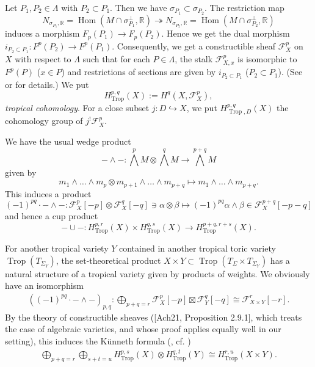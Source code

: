 \documentclass[12pt,a4]{amsart}
\def\R{\mathbb{R}}
\def\F{\mathscr{F}}
\def\Trop{\mathop{\mathrm{trop}}\nolimits}
\def\Hom{\mathop{\mathrm{Hom}}\nolimits}
\def\Trop{\mathop{\mathrm{Trop}}\nolimits}
\numberwithin{equation}{section}
\numberwithin{figure}{section}
\begin{document}
  Let $P_1,P_2 \in \Lambda$ with $P_2 \subset P_1$.
  Then we have $\sigma_{P_1} \subset \sigma_{P_2}$.
  The restriction map 
   $$ N_{\sigma_{P_1},\R } 
    = \Hom ( M \cap \sigma_{P_1}^{\perp } , \R ) 
   \twoheadrightarrow N_{\sigma_{P_2},\R }
    = \Hom ( M \cap \sigma_{P_2}^{\perp } , \R ) 
    $$ induces
  a morphism 
  $  F_p(P_1)  
      \to F_p(P_2).$
  Hence we get the dual morphism 
  $ i_{P_2 \subset P_1 } \colon  F^p(P_2)  
      \to F^p(P_1).$
  Consequently, we get a constructible sheaf $\F^p_X$ on $X$
   with respect to $\Lambda$
     such that for  each $P \in \Lambda $, 
        the stalk $\F^p_{X,x}$ is isomorphic to $F^p ( P )$ 
         ($x \in P$) 
         and restrictions of sections are given by 
      $ i_{P_2 \subset P_1 } $ ($P_2 \subset P_1$). 
     (See 
     \cite[Section 2.4]{MikhalkinZharkovTropicaleignewaveandintermediatejacobians2014} or 
     \cite[Section 3.1]{JellShawSmackaSuperformstropicalcohomologyandPoincarduality2019} for details.)   
  We put 
  $$H_{\Trop}^{p,q}(X ) := H^{ q}(X,  \F^p_X), $$
  \emph{tropical cohomology}. 
  For a close subset $j \colon D \hookrightarrow X$, 
  we put 
   $H_{\Trop,D}^{p,q}(X)$ the cohomology group 
   of $j^!\F_X^p$.


  We have the usual wedge product 
    $$ -\wedge - \colon \bigwedge^p M  \otimes \bigwedge^q M   
        \to \bigwedge^{p+q} M  $$
        given by 
    $$ m_1 \wedge \dots \wedge m_p \otimes
       m_{p+1}  \wedge \dots \wedge m_{p+q} 
       \mapsto 
     m_1 \wedge \dots \wedge m_{p+q} .$$ 
  This induces a product 
    $$  (-1)^{pq} \cdot  - \wedge - \colon \F^p_X [-p] \otimes \F^q_X [-q] 
     \ni \alpha \otimes \beta 
     \mapsto 
     (-1)^{pq} \alpha \wedge \beta 
     \in \F^{p+q}_X [-p-q]$$
  and hence a cup product 
    $$ - \cup - \colon H^{p,r}_{\Trop} (X) \times H^{q,s}_{\Trop} (X) 
       \to H^{p+q,r+s}_{\Trop} (X).$$


  For another tropical variety $Y$ contained in another tropical toric variety $\Trop (T_{\Sigma_Y})$, 
   the set-theoretical product $X \times Y \subset \Trop (T_{\Sigma} \times T_{\Sigma_Y})$
   has a natural structure of a tropical variety given by products of weights. 
  We obviously have an isomorphism 
   \begin{align}\label{eq. Kunneth F level}
     ((-1)^{pq} \cdot  - \wedge -)_{p,q} 
    \colon 
     \bigoplus_{ p + q = r } \F^p_X [-p] \boxtimes \F^q_Y [-q] \cong 
    \F^{r}_{X \times Y} [-r] .
    \end{align}
  By the theory of constructible sheaves ([Ach21, Proposition 2.9.1],  which treats the case of algebraic varieties, and whose proof applies equally well in our setting), 
  this induces the K\"{u}nneth formula 
  (\cite[Theorem B]{GrossShokirehAsheaf-theoreticapproachtotropicalhomology23}, cf. \cite{SmackaPhD2017})
  \begin{align} \label{eq. Kunneth formula}
     \bigoplus_{ p + q = r } 
    \bigoplus_{s+ t = u} 
      H^{p,s}_{\Trop} (X) \otimes H^{q,t}_{\Trop} (Y) 
       \cong H^{r,u}_{\Trop} (X \times Y) .
  \end{align}
\end{document}
